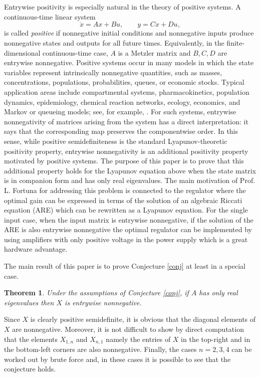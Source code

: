 \documentclass[12pt]{article}
\newtheorem{theorem}{Theorem}
\begin{document}
Entrywise positivity is especially natural in the theory of positive systems.
A continuous-time linear system
\[
\dot x=Ax+Bu,\qquad y=Cx+Du,
\]
is called {\em positive} if nonnegative initial conditions and nonnegative inputs
produce nonnegative states and outputs for all future times.  Equivalently, in
the finite-dimensional continuous-time case, $A$ is a Metzler matrix and
$B,C,D$ are entrywise nonnegative.  Positive systems occur in many models in
which the state variables represent intrinsically nonnegative quantities, such
as masses, concentrations, populations, probabilities, queues, or economic
stocks.  Typical application areas include compartmental systems,
pharmacokinetics, population dynamics, epidemiology, chemical reaction
networks, ecology, economics, and Markov or queueing models; see, for example,
\cite{Luenberger1979,FarinaRinaldi2000,BermanPlemmons1994}.
For such systems, entrywise nonnegativity of matrices arising from the system
has a direct interpretation: it says that the corresponding map preserves the
componentwise order.  In this sense, while positive semidefiniteness is the
standard Lyapunov-theoretic positivity property, entrywise nonnegativity is an
additional positivity property motivated by positive systems.  The purpose of
this paper is to prove that this additional property holds for the Lyapunov
equation above when the state matrix is in companion form and has only real
eigenvalues. The main motivation of Prof. L. Fortuna for addressing this problem is connected to the regulator where the optimal gain can be expressed in terms of the solution of an algebraic Riccati equation (ARE) which can be rewritten as a Lyapunov equation. For the single input case, when the input matrix is entrywise nonnegative, if the solution of the ARE is also entrywise  nonnegative
the optimal regulator can be implemented by using amplifiers with only positive 
voltage in the power supply which is a great hardware advantage. 


The main result of this paper is to prove Conjecture \ref{conj} at least in a special case.

\begin{theorem}\label{main-res}
Under the assumptions of Conjecture 
\ref{conj}, if $A$ has only real 
eigenvalues then $X$ is entrywise nonnegative.
\end{theorem}



\begin{remark}
Since $X$ is clearly positive semidefinite, it is obvious that the diagonal elements of $X$ are nonnegative.
Moreover, it is not difficult to show by direct computation that the elements $X_{1,n}$ and $X_{n,1}$ namely the entries of $X$ in the top-right and in the bottom-left corners are also nonnegative.
Finally, the cases $n=2,3,4$ can be worked out by brute force and, in these cases it is possible to see that the conjecture holds.
\end{remark}
\end{document}

